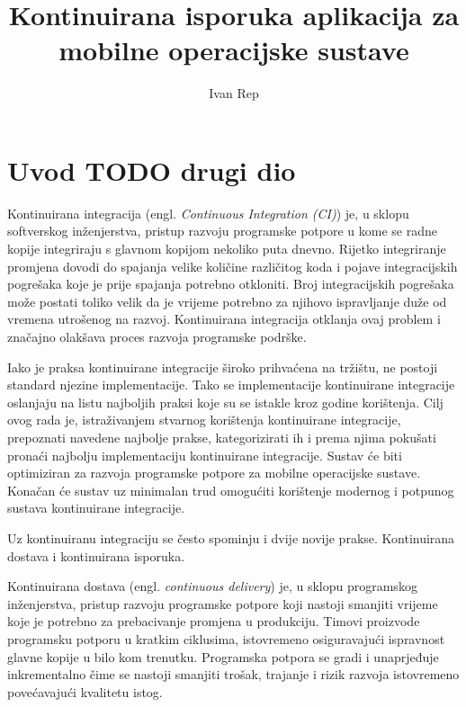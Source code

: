 \documentclass[times, utf8, seminar, numeric]{fer}
\newcommand{\eng}[1]{(engl. \textit{#1})}
\begin{document}
\nocite{*}

\title{Kontinuirana isporuka aplikacija za mobilne operacijske sustave}

\author{Ivan Rep}


\maketitle

\tableofcontents

\chapter{Uvod TODO drugi dio}
Kontinuirana integracija \eng{Continuous Integration (CI)} je, u sklopu softverskog inženjerstva, pristup razvoju programske potpore u kome se radne kopije integriraju s glavnom kopijom nekoliko puta dnevno. Rijetko integriranje promjena dovodi do spajanja velike količine različitog koda i pojave integracijskih pogrešaka koje je prije spajanja potrebno otkloniti. Broj integracijskih pogrešaka može postati toliko velik da je vrijeme potrebno za njihovo ispravljanje duže od vremena utrošenog na razvoj. Kontinuirana integracija otklanja ovaj problem i značajno olakšava proces razvoja programske podrške\citep{wiki:CI}.

Iako je praksa kontinuirane integracije široko prihvaćena na tržištu, ne postoji standard njezine implementacije. Tako se implementacije kontinuirane integracije oslanjaju na listu najboljih praksi koje su se istakle kroz godine korištenja. Cilj ovog rada je, istraživanjem stvarnog korištenja kontinuirane integracije, prepoznati navedene najbolje prakse, kategorizirati ih i prema njima pokušati pronaći najbolju implementaciju kontinuirane integracije. Sustav će biti optimiziran za razvoja programske potpore za mobilne operacijske sustave. Konačan će sustav uz minimalan trud omogućiti korištenje modernog i potpunog sustava kontinuirane integracije.

Uz kontinuiranu integraciju se često spominju i dvije novije prakse. Kontinuirana dostava i kontinuirana isporuka.

Kontinuirana dostava \eng{continuous delivery} je, u sklopu programskog inženjerstva, pristup razvoju programske potpore koji nastoji smanjiti vrijeme koje je potrebno za prebacivanje promjena u produkciju. Timovi proizvode programsku potporu u kratkim ciklusima, istovremeno osiguravajući ispravnost glavne kopije u bilo kom trenutku. Programska potpora se gradi i unaprjeđuje inkrementalno čime se nastoji smanjiti trošak, trajanje i rizik razvoja istovremeno povećavajući kvalitetu istog\citep{wiki:CD}.
\end{document}
